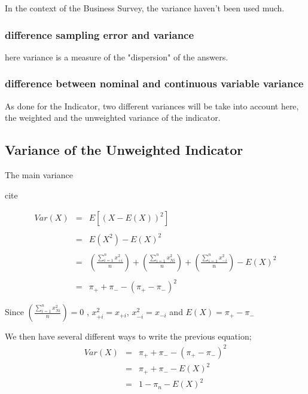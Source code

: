 \documentclass[12pt,a4paper,oneside]{book}
\begin{document}
In the context of the Business Survey, the variance haven't been used much.

\subsubsection{difference sampling error and variance}

here variance is a measure of the "dispersion" of the answers.

\subsubsection{difference between nominal and continuous variable variance}


As done for the Indicator, two different variances will be take into account here, the weighted and the unweighted variance of the indicator.


\subsection{Variance of the Unweighted Indicator}

The main variance

cite

\begin{eqnarray}
     Var(X) &=& E \left[ \left(X-E(X) \right)^2 \right] \nonumber \\ \nonumber \\
     &=& E\left( X^2\right) - E\left( X\right)^2 \nonumber \\ \nonumber \\
     &=& \left( \frac{\sum_{i=1}^n x_{+i}^2}{n} \right) + \left( \frac{\sum_{i=1}^n x_{Ni}^2}{n} \right) + \left( \frac{\sum_{i=1}^n x_{-i}^2}{n} \right) - E(X)^2  \nonumber \\ \nonumber \\
     &=& \pi_+ + \pi_- - ( \pi_+ - \pi_- )^2 \label{var1}
\end{eqnarray}

Since $\left( \frac{\sum_{i=1}^n x_{Ni}^2}{n} \right) = 0$ ,
$x_{+i}^2 = x_{+i}$, $x_{-i}^2 = x_{-i}$
and $E(X) = \pi_+ - \pi_-$


We then have several different ways to write the previous equation;
\begin{eqnarray}
Var(X) &=& \pi_+ + \pi_- - ( \pi_+ - \pi_- )^2 \nonumber \\
	&=& \pi_+ + \pi_- - E ( X )^2 \label{var2} \\
	&=& 1 - \pi_n - E(X)^2 \label{var3}
\end{eqnarray}
\end{document}
